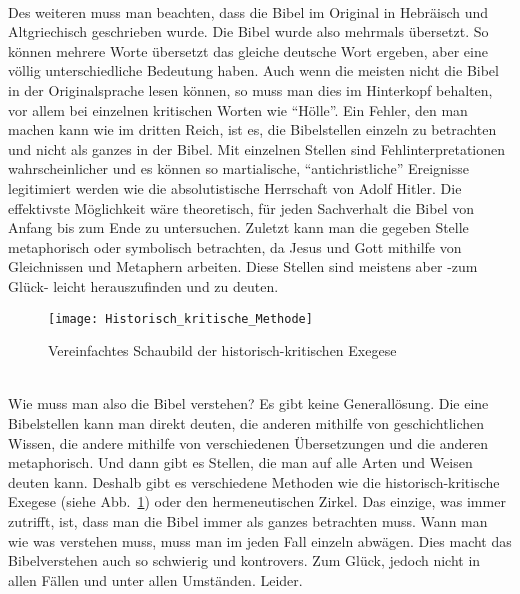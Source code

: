\\Des weiteren muss man beachten, dass die Bibel im Original in Hebräisch und Altgriechisch geschrieben wurde. Die Bibel wurde also mehrmals übersetzt. So können mehrere Worte übersetzt das gleiche deutsche Wort ergeben, aber eine völlig unterschiedliche Bedeutung haben. Auch wenn die meisten nicht die Bibel in der Originalsprache lesen können, so muss man dies im Hinterkopf behalten, vor allem bei einzelnen kritischen Worten wie ``Hölle''. Ein Fehler, den man machen kann wie im dritten Reich, ist es, die Bibelstellen einzeln zu betrachten und nicht als ganzes in der Bibel. Mit einzelnen Stellen sind Fehlinterpretationen wahrscheinlicher und es können so martialische, ``antichristliche'' Ereignisse legitimiert werden wie die absolutistische Herrschaft von Adolf Hitler. Die effektivste Möglichkeit wäre theoretisch, für jeden Sachverhalt die Bibel von Anfang bis zum Ende zu untersuchen.
Zuletzt kann man die gegeben Stelle metaphorisch oder symbolisch betrachten, da Jesus und Gott mithilfe von Gleichnissen und Metaphern arbeiten. Diese Stellen sind meistens aber -zum Glück- leicht herauszufinden und zu deuten.
\begin{figure}[h]
    \begin{center}
        \texttt{[image: Historisch\_kritische\_Methode]}
        \caption{Vereinfachtes Schaubild der historisch-kritischen Exegese}\label{HiKrMe}
    \end{center}
\end{figure}
\\Wie muss man also die Bibel verstehen? Es gibt keine Generallösung. Die eine Bibelstellen kann man direkt deuten, die anderen mithilfe von geschichtlichen Wissen, die andere mithilfe von verschiedenen Übersetzungen und die anderen metaphorisch. Und dann gibt es Stellen, die man auf alle Arten und Weisen deuten kann. Deshalb gibt es verschiedene Methoden wie die historisch-kritische Exegese (siehe Abb.\ \ref{HiKrMe}) oder den hermeneutischen Zirkel. Das einzige, was immer zutrifft, ist, dass man die Bibel immer als ganzes betrachten muss. Wann man wie was verstehen muss, muss man im jeden Fall einzeln abwägen. Dies macht das Bibelverstehen auch so schwierig und kontrovers. Zum Glück, jedoch nicht in allen Fällen und unter allen Umständen. Leider.



